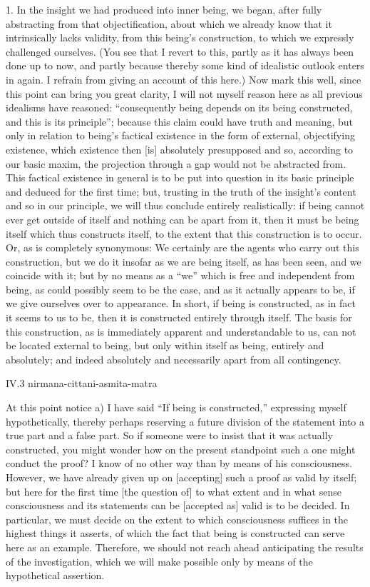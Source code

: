 1. In the insight we had produced into inner being,
we began, after fully abstracting from that objectification,
about which we already know that it intrinsically lacks validity,
from this being's construction,
to which we expressly challenged ourselves.
(You see that I revert to this,
partly as it has always been done up to now,
and partly because thereby some kind of
idealistic outlook enters in again.
I refrain from giving an account of this here.)
Now mark this well, since this point can bring you great clarity,
I will not myself reason here as all previous idealisms have reasoned:
“consequently being depends on its being constructed,
and this is its principle”;
because this claim could have truth and meaning,
but only in relation to being's factical existence
in the form of external, objectifying existence,
which existence then [is] absolutely presupposed
and so, according to our basic maxim,
the projection through a gap would not be abstracted from.
This factical existence in general is to be put into question
in its basic principle and deduced for the first time;
but, trusting in the truth of the insight's content
and so in our principle,
we will thus conclude entirely realistically:
if being cannot ever get outside of itself
and nothing can be apart from it,
then it must be being itself which thus constructs itself,
to the extent that this construction is to occur.
Or, as is completely synonymous:
We certainly are the agents who carry out this construction,
but we do it insofar as we are being itself, as has been seen,
and we coincide with it;
but by no means as a “we” which is free and independent from being,
as could possibly seem to be the case,
and as it actually appears to be,
if we give ourselves over to appearance.
In short, if being is constructed,
as in fact it seems to us to be,
then it is constructed entirely through itself.
The basis for this construction,
as is immediately apparent and understandable to us,
can not be located external to being,
but only within itself as being, entirely and absolutely;
and indeed absolutely and necessarily apart from all contingency.

IV.3
nirmana-cittani-asmita-matra

At this point notice
a) I have said “If being is constructed,”
expressing myself hypothetically,
thereby perhaps reserving a future division
of the statement into a true part and a false part.
So if someone were to insist that it was actually constructed,
you might wonder how on the present standpoint
such a one might conduct the proof?
I know of no other way than by means of his consciousness.
However, we have already given up on [accepting]
such a proof as valid by itself;
but here for the first time [the question of]
to what extent and in what sense
consciousness and its statements
can be [accepted as] valid is to be decided.
In particular, we must decide on the extent
to which consciousness suffices
in the highest things it asserts,
of which the fact that being is constructed
can serve here as an example.
Therefore, we should not reach ahead
anticipating the results of the investigation,
which we will make possible only by means of
the hypothetical assertion.

